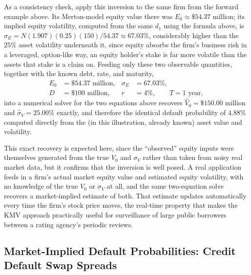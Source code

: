 \documentclass[../ai_in_finance]{subfiles}
\begin{document}
As a consistency check, apply this inversion to the same firm from the forward example above. Its Merton-model equity value there was $E_0\approx\$54.37$ million; its implied equity volatility, computed from the same $d_1$ using the formula above, is $\sigma_E = N(1.907)(0.25)(150)/54.37 \approx 67.03\%$, considerably higher than the $25\%$ asset volatility underneath it, since equity absorbs the firm's business risk in a leveraged, option-like way, an equity holder's stake is far more volatile than the assets that stake is a claim on. Feeding only these two observable quantities, together with the known debt, rate, and maturity,
\begin{align*}
E_0 &= \$54.37 \text{ million}, & \sigma_E &= 67.03\%, \\
D &= \$100 \text{ million}, & r &= 4\%, \qquad T = 1 \text{ year},
\end{align*}
into a numerical solver for the two equations above recovers $\hat V_0 = \$150.00$ million and $\hat\sigma_V = 25.00\%$ exactly, and therefore the identical default probability of $4.88\%$ computed directly from the (in this illustration, already known) asset value and volatility.

This exact recovery is expected here, since the ``observed'' equity inputs were themselves generated from the true $V_0$ and $\sigma_V$ rather than taken from noisy real market data, but it confirms that the inversion is well posed.
A real application feeds in a firm's actual market equity value and estimated equity volatility, with no knowledge of the true $V_0$ or $\sigma_V$ at all, and the same two-equation solve recovers a market-implied estimate of both. That estimate updates automatically every time the firm's stock price moves, the real-time property that makes the KMV approach practically useful for surveillance of large public borrowers between a rating agency's periodic reviews.

\subsection{Market-Implied Default Probabilities: Credit Default Swap Spreads}
\end{document}

